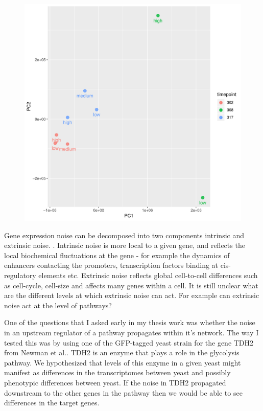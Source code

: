 \begin{figure}[t!]  
    \centering
    \includegraphics[width=\linewidth]{figures/intro/intro_tdh2_clustering_timepoints.pdf}
    \caption[]{%
        \textbf{}
    }
    \label{fig:tdh2_pca}
\end{figure}

Gene expression noise can be decomposed into two components intrinsic and extrinsic noise. \cite{elowitz} \cite{oshea}. Intrinsic noise is more local to a given gene, and reflects the local biochemical fluctuations at the gene - for example the dynamics of enhancers contacting the promoters, transcription factors binding at cis-regulatory elements etc. Extrinsic noise reflects global cell-to-cell differences such as cell-cycle, cell-size and affects many genes within a cell. It is still unclear what are the different levels at which extrinsic noise can act. For example can extrinsic noise act at the level of pathways?

One of the questions that I asked early in my thesis work was whether the noise in an upstream regulator of a pathway propagates within it's network. The way I tested this was by using one of the GFP-tagged yeast strain for the gene TDH2 from Newman et al.\cite{Newman}. TDH2 is an enzyme that plays a role in the glycolysis pathway. We hypothesized that levels of this enzyme in a given yeast might manifest as differences in the transcriptomes between yeast and possibly phenotypic differences between yeast. If the noise in TDH2 propagated downstream to the other genes in the pathway then we would be able to see differences in the target genes. 

